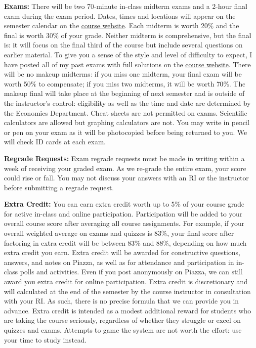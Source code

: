 \documentclass[11pt, letterpaper]{article}
\begin{document}
\medskip

\noindent \textbf{Exams:} 
There will be two 70-minute in-class midterm exams and a 2-hour final exam during the exam period.
Dates, times and locations will appear on the semester calendar on the \href{http://ditraglia.com/Econ103Public}{course website}.
Each midterm is worth 20\% and the final is worth 30\% of your grade.
Neither midterm is comprehensive, but the final is: it will focus on the final third of the course but include several questions on earlier material.
To give you a sense of the style and level of difficulty to expect, I have posted all of my past exams with full solutions on the \href{http://ditraglia.com/Econ103Public}{course website}.
There will be no makeup midterms: if you miss one midterm, your final exam will be worth 50\% to compensate; if you miss two midterms, it will be worth 70\%.
The makeup final will take place at the beginning of next semester and is outside of the instructor's control: eligibility as well as the time and date are determined by the Economics Department. 
Cheat sheets are not permitted on exams.
Scientific calculators are allowed but graphing calculators are not. 
You may write in pencil or pen on your exam as it will be photocopied before being returned to you.
We will check ID cards at each exam.

\medskip

\noindent \textbf{Regrade Requests:}
Exam regrade requests must be made in writing within a week of receiving your graded exam. 
As we re-grade the entire exam, your score could rise or fall. 
You may not discuss your answers with an RI or the instructor before submitting a regrade request. 


\medskip

\noindent \textbf{Extra Credit:} 
You can earn extra credit worth up to 5\% of your course grade for active in-class and online participation. 
Participation will be added to your overall course score after averaging all course assignments.
For example, if your overall weighted average on exams and quizzes is 83\%, your final score after factoring in extra credit will be between 83\% and 88\%, depending on how much extra credit you earn. 
Extra credit will be awarded for constructive questions, answers, and notes on Piazza, as well as for attendance and participation in in-class polls and activities.
Even if you post anonymously on Piazza, we can still award you extra credit for online participation.
Extra credit is discretionary and will calculated at the end of the semester by the course instructor in consultation with your RI.
As such, there is no precise formula that we can provide you in advance.
Extra credit is intended as a modest additional reward for students who are taking the course seriously, regardless of whether they struggle or excel on quizzes and exams. 
Attempts to game the system are not worth the effort: use your time to study instead.
\end{document}
